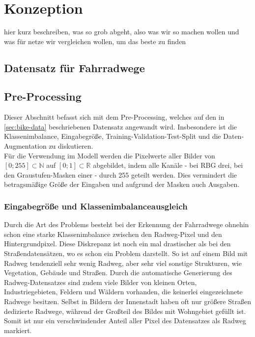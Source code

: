\chapter{Konzeption} %

hier kurz beschreiben, was so grob abgeht, also was wir so machen wollen und was für netze wir vergleichen wollen,
um das beste zu finden

\section{Datensatz für Fahrradwege}


\section{Pre-Processing} \label{sec:pre-processing}

Dieser Abschnitt befasst sich mit dem Pre-Processing, welches auf den in \autoref{sec:bike-data} 
beschriebenen Datensatz angewandt wird. Insbesondere ist die Klassenimbalance, Eingabegröße, 
Training-Validation-Test-Split und die Daten-Augmentation zu diskutieren. \\
Für die Verwendung im Modell werden die Pixelwerte aller Bilder von $[0; 255] \subset \mathbb{N}$
auf $[0;1] \subset \mathbb{R}$ abgebildet, indem alle Kanäle - bei RBG drei, bei den Graustufen-Masken einer - durch 255 geteilt werden.
Dies vermindert die betragsmäßige Größe der Eingaben und aufgrund der Masken auch Ausgaben. 

\subsection{Eingabegröße und Klassenimbalanceausgleich}

Durch die Art des Problems besteht bei der Erkennung der Fahrradwege ohnehin schon eine starke 
Klassenimbalance zwischen den Radweg-Pixel und den Hintergrundpixel. Diese Diskrepanz ist noch ein mal drastischer 
als bei den Straßendatensätzen, wo es schon ein Problem darstellt. So ist auf einem Bild mit Radweg 
tendenziell sehr wenig Radweg, aber sehr viel sonstige Strukturen, wie Vegetation, Gebäude und Straßen. 
Durch die automatische Generierung des Radweg-Datensatzes sind zudem viele Bilder von kleinen Orten,
Industriegebieten, Feldern und Wäldern vorhanden, die keinerlei eingezeichnete Radwege besitzen. 
Selbst in Bildern der Innenstadt haben oft nur größere Straßen dedizierte Radwege, während der 
Großteil des Bildes mit Wohngebiet gefüllt ist. 
Somit ist nur ein verschwindender Anteil aller Pixel des Datensatzes als Radweg markiert. 

